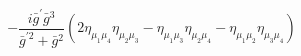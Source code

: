 %
\begin{dmath*}
%
  -  \frac{i {\bar g}^\prime {\bar g}{}^3}{{\bar g}^{\prime 2} + {\bar g}{}^2} \left(2 \eta_{\mu_1 \mu_4} \eta_{\mu_2 \mu_3} - \eta_{\mu_1 \mu_3} \eta_{\mu_2 \mu_4} - \eta_{\mu_1 \mu_2} \eta_{\mu_3 \mu_4}\right)
%
\end{dmath*}
%
